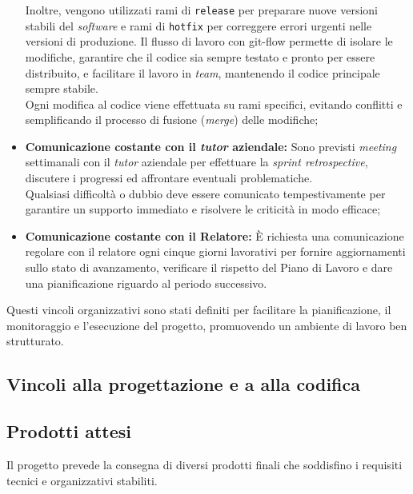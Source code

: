\begin{itemize}
    Inoltre, vengono utilizzati rami di \texttt{release} per preparare nuove versioni stabili del \textit{software} e rami di \texttt{hotfix} per correggere errori urgenti nelle versioni di produzione.
    Il flusso di lavoro con \gls{git-flow} permette di isolare le modifiche, garantire che il codice sia sempre testato e pronto per essere distribuito, e facilitare il lavoro in \textit{team}, mantenendo il codice principale sempre stabile.\\
    Ogni modifica al codice viene effettuata su rami specifici, evitando conflitti e semplificando il processo di fusione (\textit{merge}) delle modifiche;
    \item \textbf{Comunicazione costante con il \textit{tutor} aziendale:} Sono previsti \textit{meeting} settimanali con il \textit{tutor} aziendale per effettuare la \textit{sprint retrospective}, discutere i progressi ed affrontare eventuali problematiche.\\
    Qualsiasi difficoltà o dubbio deve essere comunicato tempestivamente per garantire un supporto immediato e risolvere le criticità in modo efficace;
    \item \textbf{Comunicazione costante con il Relatore:} È richiesta una comunicazione regolare con il relatore ogni cinque giorni lavorativi per fornire aggiornamenti sullo stato di avanzamento, verificare il rispetto del Piano di Lavoro e dare una pianificazione riguardo al periodo successivo.\\
\end{itemize}

\noindent Questi vincoli organizzativi sono stati definiti per facilitare la pianificazione, il monitoraggio e l’esecuzione del progetto, promuovendo un ambiente di lavoro ben strutturato.

\subsection{Vincoli alla progettazione e a alla codifica}




\subsection{Prodotti attesi}
\label{subsec:prodotti-attesi}

Il progetto prevede la consegna di diversi prodotti finali che soddisfino i requisiti tecnici e organizzativi stabiliti.\\

